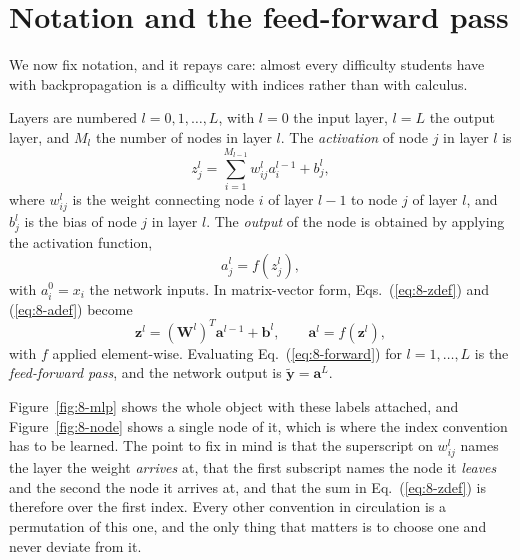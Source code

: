 
\section{Notation and the feed-forward pass}
\label{sec:nnnotation}

We now fix notation, and it repays care: almost every difficulty students have
with backpropagation is a difficulty with indices rather than with calculus.

Layers are numbered $l=0,1,\dots,L$, with $l=0$ the input layer, $l=L$ the
output layer, and $M_l$ the number of nodes in layer $l$.  The
\emph{activation} of node $j$ in layer $l$ is
\begin{equation}
  z_j^l = \sum_{i=1}^{M_{l-1}}w_{ij}^{l}a_i^{l-1}+b_j^{l},
  \label{eq:8-zdef}
\end{equation}
where $w_{ij}^{l}$ is the weight connecting node $i$ of layer $l-1$ to node $j$
of layer $l$, and $b_j^{l}$ is the bias of node $j$ in layer $l$.  The
\emph{output} of the node is obtained by applying the activation function,
\begin{equation}
  a_j^l = f\left(z_j^l\right),
  \label{eq:8-adef}
\end{equation}
with $a_i^{0}=x_i$ the network inputs.  In matrix-vector form,
Eqs.~(\ref{eq:8-zdef}) and (\ref{eq:8-adef}) become
\begin{equation}
  \boxed{\;
  \bm{z}^l = \left(\bm{W}^{l}\right)^{T}\bm{a}^{l-1}+\bm{b}^{l},
  \qquad
  \bm{a}^l = f\left(\bm{z}^l\right), \;}
  \label{eq:8-forward}
\end{equation}
with $f$ applied element-wise.  Evaluating Eq.~(\ref{eq:8-forward}) for
$l=1,\dots,L$ is the \emph{feed-forward pass}, and the network output is
$\tilde{\bm{y}}=\bm{a}^{L}$.

Figure~\ref{fig:8-mlp} shows the whole object with these labels attached, and
Figure~\ref{fig:8-node} shows a single node of it, which is where the index
convention has to be learned.  The point to fix in mind is that the superscript
on $w_{ij}^{l}$ names the layer the weight \emph{arrives} at, that the first
subscript names the node it \emph{leaves} and the second the node it arrives
at, and that the sum in Eq.~(\ref{eq:8-zdef}) is therefore over the first
index.  Every other convention in circulation is a permutation of this one, and
the only thing that matters is to choose one and never deviate from it.


